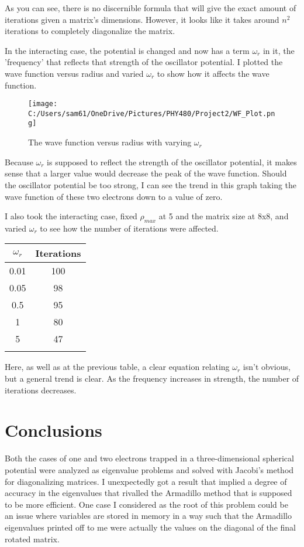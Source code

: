 \documentclass[10pt,showpacs,preprintnumbers,footinbib,amsmath,amssymb,aps,prl,twocolumn,groupedaddress,superscriptaddress,showkeys]{revtex4-1}
\begin{document}
	As you can see, there is no discernible formula that will give the exact amount of iterations given a matrix's dimensions. However, it looks like it takes around $n^{2}$ iterations to completely diagonalize the matrix.

In the interacting case, the potential is changed and now has a term $\omega_{r}$ in it, the 'frequency' that reflects that strength of the oscillator potential. I plotted the wave function versus radius and varied $\omega_{r}$ to show how it affects the wave function.

	\begin{figure}[!ht]
	\centering
	\texttt{[image: C:/Users/sam61/OneDrive/Pictures/PHY480/Project2/WF\_Plot.png]}
	\label{}
	\caption{The wave function versus radius with varying $\omega_{r}$}
\end{figure}

Because $\omega_{r}$ is supposed to reflect the strength of the oscillator potential, it makes sense that a larger value would decrease the peak of the wave function. Should the oscillator potential be too strong, I can see the trend in this graph taking the wave function of these two electrons down to a value of zero.

I also took the interacting case, fixed $\rho_{max}$ at 5 and the matrix size at 8x8, and varied $\omega_{r}$ to see how the number of iterations were affected.

	\begin{center}
		\begin{tabular}{cc}
			\hline \hline
			$\omega_{r}$ & Iterations \\
			\hline		
			0.01 & 100  \\
			0.05  & 98 \\
			0.5 & 95 \\
			1 & 80 \\
			5 & 47 \\
			\hline
			\label{iterationsOmega}
		\end{tabular}
	\end{center}
	
Here, as well as at the previous table, a clear equation relating $\omega_{r}$ isn't obvious, but a general trend is clear. As the frequency increases in strength, the number of iterations decreases.

\section{Conclusions}
	Both the cases of one and two electrons trapped in a three-dimensional spherical potential were analyzed as eigenvalue problems and solved with Jacobi's method for diagonalizing matrices. I unexpectedly got a result that implied a degree of accuracy in the eigenvalues that rivalled the Armadillo method that is supposed to be more efficient. One case I considered as the root of this problem could be an issue where variables are stored in memory in a way such that the Armadillo eigenvalues printed off to me were actually the values on the diagonal of the final rotated matrix. 
\end{document}
